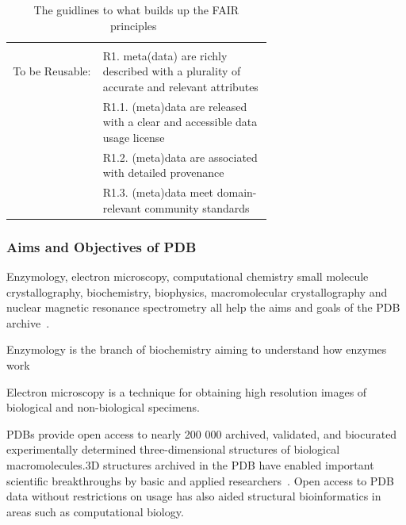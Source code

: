 \documentclass[]{final_report}
\begin{document}
\begin{table}[h!]
\begin{center}
\begin{tabular}{c|p{0.65\linewidth}}
        \\
        \hline
        \\
        To be Reusable: & R1. meta(data) are richly described with a plurality of accurate and relevant attributes\\
        & R1.1. (meta)data are released with a clear and accessible data usage license\\ & R1.2. (meta)data are associated with detailed provenance\\ &
        R1.3. (meta)data meet domain-relevant community standards\\
        \end{tabular}
        \caption{\label{Fair}The guidlines to what builds up the FAIR principles~\cite{wilkinson_fair_2016}}
    \end{center}
\end{table}

\clearpage

\subsubsection{Aims and Objectives of PDB}

Enzymology, electron microscopy, computational chemistry small molecule crystallography, biochemistry, biophysics, macromolecular crystallography and nuclear magnetic resonance spectrometry all help the aims and goals of the PDB archive~\cite{behzadi_worldwide_2021}.

\begin{definition}[Enzymology]
    Enzymology is the branch of biochemistry aiming to understand how enzymes work
\end{definition}

\begin{definition}
    Electron microscopy is a technique for obtaining high resolution images of biological and non-biological specimens.
\end{definition}

PDBs provide open access to nearly 200 000 archived, validated, and biocurated experimentally determined three-dimensional structures of biological macromolecules.3D structures archived in the PDB have enabled important scientific breakthroughs by basic and applied researchers~\cite{burley_impact_2021}. Open access to PDB data without restrictions on usage has also aided structural bioinformatics in areas such as computational biology.

\clearpage
\end{document}
